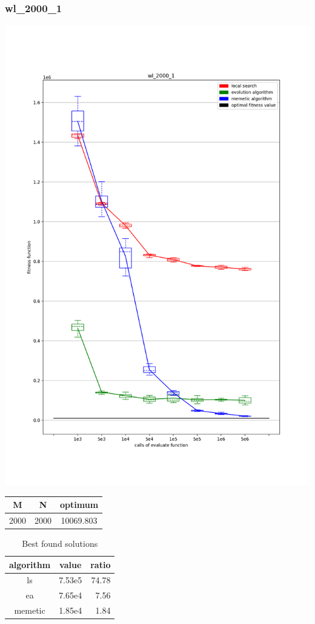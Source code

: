 \documentclass{beamer}
\begin{document}
\begin{frame}
    \frametitle{wl\_2000\_1}
    \begin{minipage}{0.5\textwidth}
        \includegraphics[width=\textwidth]{wl_2000_1.png}
    \end{minipage}
    \begin{minipage}{0.4\textwidth}
        \begin{tabular}{ c | c | c }
            M & N & optimum \\
            \hline
            2000 & 2000 & 10069.803 \\
        \end{tabular}
        \begin{table}
            \centering
            \begin{tabular}{ c | c | r }
                algorithm & value & ratio \\
                \hline
                ls & 7.53e5 & 74.78 \\
                ea & 7.65e4 & 7.56 \\
                memetic & 1.85e4 & 1.84 \\
            \end{tabular}
            \caption{Best found solutions}
        \end{table}
    \end{minipage}
\end{frame}
\end{document}
